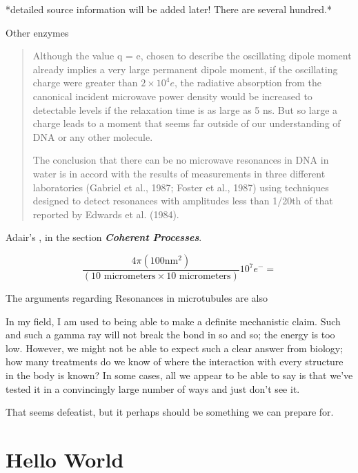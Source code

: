 \documentclass[paper.tex]{subfiles}
\begin{document}

*detailed source information will be added later! There are several hundred.*



Other enzymes

\cite{Vibrational2002}
\begin{quote}
Although the value q = e, chosen to describe the oscillating dipole moment already implies a very large permanent dipole moment, if the oscillating charge were greater
than $2\times 10^4 e$, the radiative absorption from the canonical
incident microwave power density would be increased to
detectable levels if the relaxation time is as large as 5 ns.
But so large a charge leads to a moment that seems far
outside of our understanding of DNA or any other molecule.


The conclusion that there can be no microwave resonances in DNA in water is in accord with the results of
measurements in three different laboratories (Gabriel et al.,
1987; Foster et al., 1987) using techniques designed to
detect resonances with amplitudes less than 1/20th of that
reported by Edwards et al. (1984).
\end{quote}

Adair's \cite{Vibrational2002}, in the section {\it \bf Coherent Processes}. 

$$\frac{4 \pi (100 \text{nm}^2)}{(10 \text{ micrometers} \times 10 \text{ micrometers})} 10^7 e^- = $$

The arguments regarding Resonances in microtubules are also 




In my field, I am used to being able to make a definite mechanistic claim. Such and such a gamma ray will not break the bond in so and so; the energy is too low. However, we might not be able to expect such a clear answer from biology; how many treatments do we know of where the interaction with every structure in the body is known? In some cases, all we appear to be able to say is that we've tested it in a convincingly large number of ways and just don't see it.

That seems defeatist, but it perhaps should be something we can prepare for.


\cite{Identification2018}



\section{Hello World}
\end{document}

